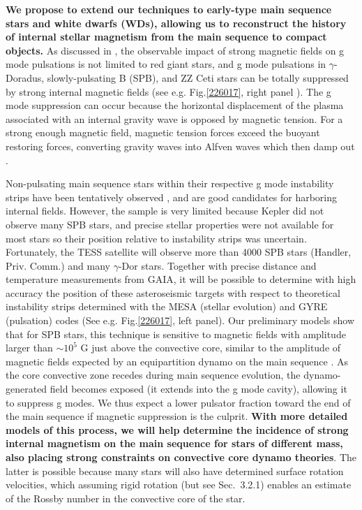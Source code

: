\textbf{ We propose to extend our techniques to early-type main sequence stars and white dwarfs (WDs), allowing us to reconstruct the history of internal stellar magnetism from the main sequence to compact objects.} As discussed in \citet{Cantiello_2016}, the observable impact of strong magnetic fields on g mode pulsations is not limited to red giant stars, and g mode pulsations in $\gamma$-Doradus, slowly-pulsating B (SPB), and ZZ Ceti stars can be totally suppressed by strong internal magnetic fields (see e.g. Fig.\ref{226017}, right panel ). {\color{green} The g mode suppression can occur because the horizontal displacement of the plasma associated with an internal gravity wave is opposed by magnetic tension. For a strong enough magnetic field, magnetic tension forces exceed the buoyant restoring forces, converting gravity waves into Alfven waves which then damp out \cite{lecoanet:17}.}

Non-pulsating main sequence stars within their respective g mode instability strips have been tentatively observed \citep{Balona_2011}, and are good candidates for harboring internal fields.
However, the sample is very limited because Kepler did not observe many SPB stars, and precise stellar properties were not available for most stars so their position relative to instability strips was uncertain. Fortunately, the TESS satellite will observe more than 4000 SPB stars (Handler, Priv. Comm.) and many $\gamma$-Dor stars. Together with precise distance and temperature measurements from GAIA, it will be possible to determine with high accuracy the position of these asteroseismic targets with respect to theoretical instability strips determined with the MESA (stellar evolution) and GYRE (pulsation) codes (See e.g. Fig.\ref{226017}, left panel). Our preliminary models show that for SPB stars, this technique is sensitive to magnetic fields with amplitude larger than $\sim \! 10^5$ G just above the convective core, similar to the amplitude of magnetic fields expected by an equipartition dynamo on the main sequence \citep[See e.g.][]{Featherstone_2009,Augustson_2016}. As the core convective zone recedes during main sequence evolution, the dynamo-generated field becomes exposed (it extends into the g mode cavity), allowing it to suppress g modes. We thus expect a lower pulsator fraction toward the end of the main sequence if magnetic suppression is the culprit. \textbf{With more detailed models of this process, we will help determine the incidence of strong internal magnetism on the main sequence for stars of different mass, also placing strong constraints on convective core dynamo theories}. The latter is possible because many stars will also have determined surface rotation velocities, which assuming rigid rotation (but see Sec.~3.2.1) enables an estimate of the Rossby number in the convective core of the star.


